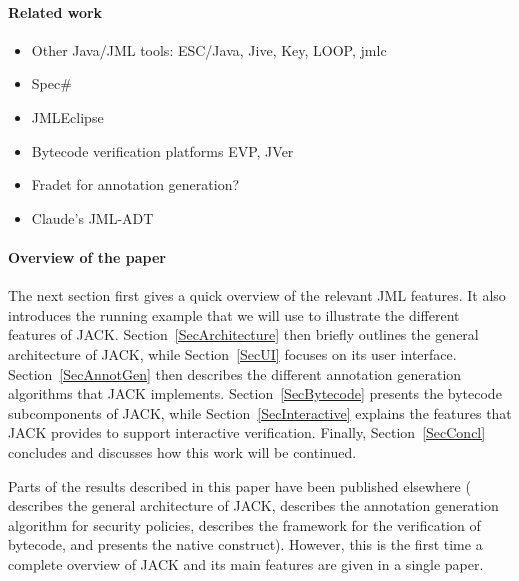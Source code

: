 \paragraph{Related work}
\begin{itemize}
\item Other Java/JML tools: ESC/Java, Jive, Key, LOOP, jmlc
\item Spec\#
\item JMLEclipse
\item Bytecode verification platforms EVP, JVer
\item Fradet for annotation generation?
\item Claude's JML-ADT
\end{itemize}

\paragraph{Overview of the paper}
The next section first gives a quick overview of the relevant JML
features. It also introduces the running example that we will use to
illustrate the different features of JACK. Section~\ref{SecArchitecture} then
briefly outlines the general architecture of JACK, while
Section~\ref{SecUI} focuses on its user
interface. Section~\ref{SecAnnotGen} then describes the different
annotation generation algorithms that JACK
implements. Section~\ref{SecBytecode} presents the bytecode
subcomponents of JACK, while Section~\ref{SecInteractive} explains the
features that JACK provides to support interactive
verification. Finally, Section~\ref{SecConcl} concludes and discusses
how this work will be continued.

Parts of the results described in this paper have been published
elsewhere (\cite{BurdyRL03} describes the general architecture of
JACK, \cite{PavlovaBBHL04cardis} describes the annotation generation
algorithm for security policies, \cite{BP06JSV} describes the
framework for the verification of bytecode, and \cite{Charles06}
presents the native construct). However, this is the first time a
complete overview of JACK and its main features are given in a single
paper.



